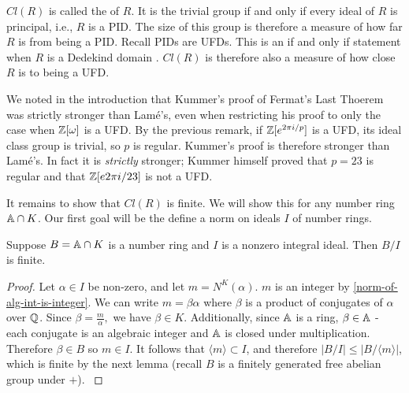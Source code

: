 \begin{remark}
$Cl(R)$ is called the  of $R$. It is the trivial group if and only if every ideal of $R$ is principal, i.e., $R$ is a PID. The size of this group is therefore a measure of how far $R$ is from being a PID. Recall PIDs are UFDs. This is an if and only if statement when $R$ is a Dedekind domain \cite{Wright}. $Cl(R)$ is therefore also a measure of how close $R$ is to being a UFD.
\end{remark}

\begin{remark}\label{remark-strictly-stronger}
We noted in the introduction that Kummer's proof of Fermat's Last Thoerem was strictly stronger than Lamé's, even when restricting his proof to only the case when $\mathbb{Z}[\omega]$ is a UFD. By the previous remark, if $\mathbb{Z}[e^{2\pi i/p}]$ is a UFD, its ideal class group is trivial, so $p$ is regular. Kummer's proof is therefore stronger than Lamé's. In fact it is \textit{strictly} stronger; Kummer himself proved that $p=23$ is regular and that $\mathbb{Z}[e{2\pi i/23}]$ is not a UFD.
\end{remark}

It remains to show that $Cl(R)$ is finite. We will show this for any number ring $\mathbb{A}\cap K$. Our first goal will be the define a norm on ideals $I$ of number rings.


\begin{lemma}\label{norm-of-ideal-well-defined}
Suppose $B=\mathbb{A}\cap K$ is a number ring and $I$ is a nonzero integral ideal. Then $B/I$ is finite.
\end{lemma}
\begin{proof}
Let $\alpha\in I$ be non-zero, and let $m=N^K(\alpha)$. $m$ is an integer by \cref{norm-of-alg-int-is-integer}. We can write $m=\beta\alpha$ where $\beta$ is a product of conjugates of $\alpha$ over $\mathbb{Q}$. Since $\beta=\frac{m}{\alpha},$ we have $\beta\in K.$ Additionally, since $\mathbb{A}$ is a ring, $\beta \in \mathbb{A}$ - each conjugate is an algebraic integer and $\mathbb{A}$ is closed under multiplication. Therefore $\beta\in B$ so $m\in I$. It follows that $\langle m \rangle\subset I$, and therefore $|B/I|\leq |B/\langle m\rangle|$, which is finite by the next lemma (recall $B$ is a finitely generated free abelian group under $+$).
\cite{NumberFields}
\end{proof}

